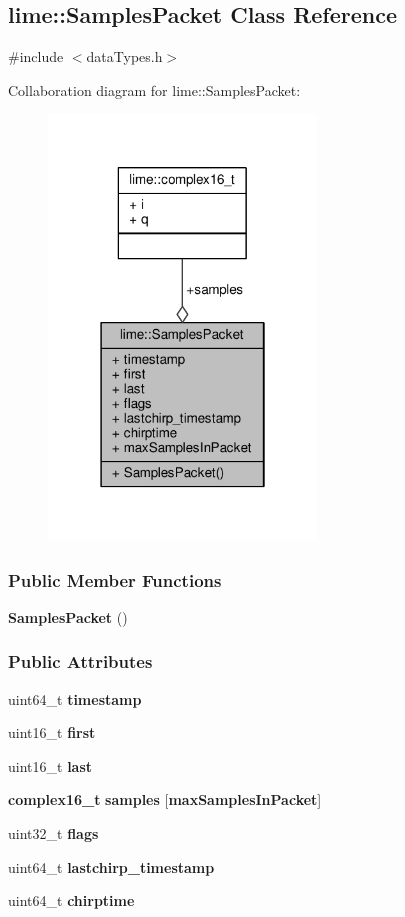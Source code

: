 \subsection{lime\+:\+:Samples\+Packet Class Reference}
\label{classlime_1_1SamplesPacket}


{\ttfamily \#include $<$data\+Types.\+h$>$}



Collaboration diagram for lime\+:\+:Samples\+Packet\+:
\nopagebreak
\begin{figure}[H]
\begin{center}
\leavevmode
\includegraphics[width=202pt]{d3/dbc/classlime_1_1SamplesPacket__coll__graph}
\end{center}
\end{figure}
\subsubsection*{Public Member Functions}
\begin{DoxyCompactItemize}
\item 
{\bf Samples\+Packet} ()
\end{DoxyCompactItemize}
\subsubsection*{Public Attributes}
\begin{DoxyCompactItemize}
\item 
uint64\+\_\+t {\bf timestamp}
\item 
uint16\+\_\+t {\bf first}
\item 
uint16\+\_\+t {\bf last}
\item 
{\bf complex16\+\_\+t} {\bf samples} [{\bf max\+Samples\+In\+Packet}]
\item 
uint32\+\_\+t {\bf flags}
\item 
uint64\+\_\+t {\bf lastchirp\+\_\+timestamp}
\item 
uint64\+\_\+t {\bf chirptime}
\end{DoxyCompactItemize}
